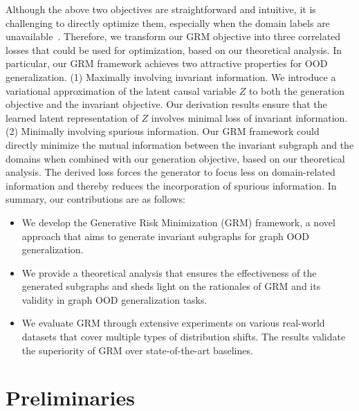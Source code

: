 Although the above two objectives are straightforward and intuitive, it is challenging to directly optimize them, especially when the domain labels are unavailable~\citep{wudiscovering}. Therefore, we transform our GRM objective into three correlated losses that could be used for optimization, based on our theoretical analysis. In particular, our GRM framework achieves two attractive properties for OOD generalization. (1) Maximally involving invariant information. We introduce a variational approximation of the latent causal variable $Z$ to both the generation objective and the invariant objective. Our derivation results ensure that the learned latent representation of $Z$ involves minimal loss of invariant information. 
(2) Minimally involving spurious information. %
Our GRM framework could directly minimize the mutual information between the invariant subgraph and the domains when combined with our generation objective, based on our theoretical analysis. The derived loss forces the generator to focus less on domain-related information and thereby reduces the incorporation of spurious information. 
In summary, our contributions are as follows:
\begin{itemize}[leftmargin=0.5cm] %
    \item We develop the Generative Risk Minimization (GRM) framework, a novel approach that aims to generate invariant subgraphs for graph OOD generalization.
    \item We provide a theoretical analysis that ensures the effectiveness of the generated subgraphs and sheds light on the rationales of GRM and its validity in graph OOD generalization tasks.
    \item We evaluate GRM through extensive experiments on various real-world datasets that cover multiple types of distribution shifts. The results validate the superiority of GRM over state-of-the-art baselines.
\end{itemize}






\section{Preliminaries}


